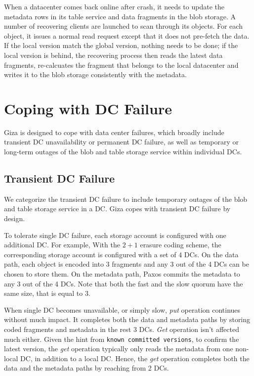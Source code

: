 When a datacenter comes back online after crash, it needs to update the
metadata rows in its table service and data fragments in the blob storage.
A number of recovering clients are launched to scan through its objects.
For each object, it issues a normal read request except that it does not
pre-fetch the data. If the local version match the global version, nothing
needs to be done; if the local version is behind, the recovering process
then reads the latest data fragments, re-calcuates the fragment that belongs
to the local datacenter and writes it to the blob storage consistently with
the metadata.


\section{Coping with DC Failure}


Giza is designed to cope with data center failures,
which broadly include transient DC unavailability or permanent DC failure,
as well as temporary or long-term outages of the blob and table storage service within individual DCs.

\subsection{Transient DC Failure}

We categorize the transient DC failure to include temporary outages of the blob
and table storage service in a DC.  Giza copes with transient DC failure by
design. 

To tolerate single DC failure, each \name storage account is configured with
one additional DC.  For example, With the $2 + 1$ erasure coding scheme, the
corresponding storage account is configured with a set of 4 DCs.  On the data
path, each object is encoded into 3 fragments and any 3 out of the 4 DCs can be
chosen to store them.  On the metadata path, Paxos commits the metadata to any
3 out of the 4 DCs. Note that both the fast and the slow quorum have the same
size, that is equal to 3.

When single DC becomes unavailable, or simply slow, {\em put} operation
continues without much impact. It completes both the data and metadata paths by
storing coded fragments and metadata in the rest 3 DCs. {\em Get} operation
isn't affected much either. Given the hint from {\tt known committed versions},
to confirm the latest version, the {\em get} operation typically only reads the
metadata from one non-local DC, in addition to a local DC. Hence, the {\em get}
operation completes both the data and the metadata paths by reaching from 2
DCs.

